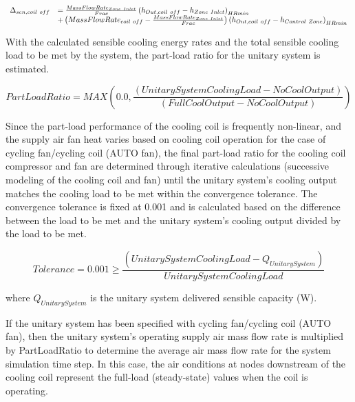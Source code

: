 \begin{equation}
  \begin{array}{rl}
    \Delta_{sen,coil~off} &= \frac{MassFlowRate_{Zone~Inlet}}{Frac} \left(h_{Out,coil~off} - h_{Zone~Inlet}\right)_{HRmin} \\
                           &+ \left(MassFlowRate_{coil~off} - \frac{MassFlowRate_{Zone~Inlet}}{Frac}\right) \left( h_{Out,coil~off} - h_{Control~Zone}\right)_{HRmin}
  \end{array}
\end{equation}

With the calculated sensible cooling energy rates and the total sensible cooling load to be met by the system, the part-load ratio for the unitary system is estimated.

\begin{equation}
PartLoadRatio = MAX\left( {0.0,\frac{{\left( {UnitarySystemCoolingLoad - NoCoolOutput} \right)}}{{\left( {FullCoolOutput - NoCoolOutput} \right)}}} \right)
\end{equation}

Since the part-load performance of the cooling coil is frequently non-linear, and the supply air fan heat varies based on cooling coil operation for the case of cycling fan/cycling coil (AUTO fan), the final part-load ratio for the cooling coil compressor and fan are determined through iterative calculations (successive modeling of the cooling coil and fan) until the unitary system's cooling output matches the cooling load to be met within the convergence tolerance. The convergence tolerance is fixed at 0.001 and is calculated based on the difference between the load to be met and the unitary system's cooling output divided by the load to be met.

\begin{equation}
Tolerance = 0.001 \ge \frac{{\left( {UnitarySystemCoolingLoad - {Q_{UnitarySystem}}} \right)}}{{UnitarySystemCoolingLoad}}
\end{equation}

where \({Q_{UnitarySystem}}\) is the unitary system delivered sensible capacity (W).

If the unitary system has been specified with cycling fan/cycling coil (AUTO fan), then the unitary system's operating supply air mass flow rate is multiplied by PartLoadRatio to determine the average air mass flow rate for the system simulation time step. In this case, the air conditions at nodes downstream of the cooling coil represent the full-load (steady-state) values when the coil is operating.

